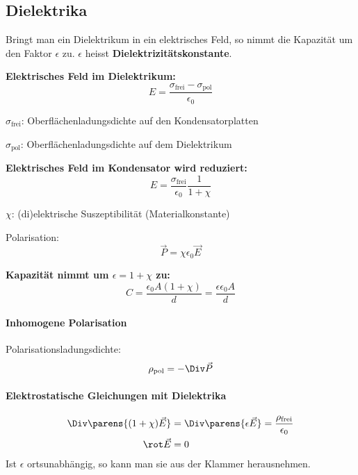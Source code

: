 	\subsection{Dielektrika} %
		Bringt man ein Dielektrikum in ein elektrisches Feld, so nimmt die Kapazität um den Faktor $\epsilon$ zu. $\epsilon$ heisst \textbf{Dielektrizitätskonstante}.
		
		\textbf{Elektrisches Feld im Dielektrikum:}
		\begin{equation*}
			E = \frac{\sigma_{\text{frei}} - \sigma_{\text{pol}}}{\epsilon_0}
		\end{equation*}
		\begin{tightitemize}
			\item[$\sigma_{\text{frei}}$:] Oberflächenladungsdichte auf den Kondensatorplatten
			\item[$\sigma_{\text{pol}}$:] Oberflächenladungsdichte auf dem Dielektrikum
		\end{tightitemize}
		
		\textbf{Elektrisches Feld im Kondensator wird reduziert:}
		\begin{equation*}
			E = \frac{\sigma_{\text{frei}}}{\epsilon_0} \frac{1}{1+\chi}
		\end{equation*}
		\begin{tightitemize}
			\item[$\chi$:] (di)elektrische Suszeptibilität (Materialkonstante)
		\end{tightitemize}
		
		Polarisation:
		\begin{equation}
			\vec P = \chi \epsilon_0 \vec E \label{eq:dielektrika_polarisation}
		\end{equation}
		
		\textbf{Kapazität nimmt um $\epsilon = 1 + \chi$ zu:}
		\begin{equation*}
			C = \frac{\epsilon_0 A(1+\chi)}{d} = \frac{\epsilon \epsilon_0 A}{d}
		\end{equation*}
		
		\paragraph{Inhomogene Polarisation} %
			Polarisationsladungsdichte:
			\begin{equation*}
				\rho_{\text{pol}} = - \Div \vec P
			\end{equation*}
		
		\paragraph{Elektrostatische Gleichungen mit Dielektrika} %
			\begin{align*}
				\Div \parens{
					(1+\chi)\vec E
				} &= \Div \parens{\epsilon \vec E} = \frac{\rho_{\text{frei}}}{\epsilon_0} \\
				\rot \vec E &= 0
			\end{align*}
			Ist $\epsilon$ ortsunabhängig, so kann man sie aus der Klammer herausnehmen.
		
